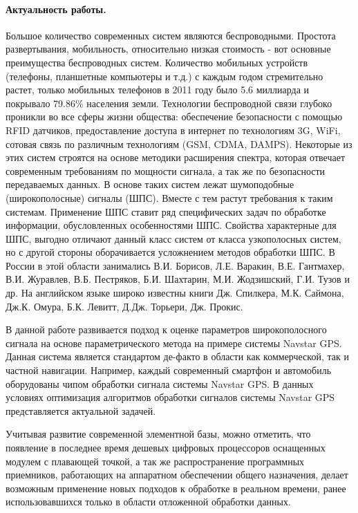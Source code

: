 \paragraph{Актуальность работы.} Большое количество современных систем являются беспроводными. Простота развертывания, мобильность, относительно низкая
стоимость - вот основные преимущества беспроводных систем. Количество мобильных устройств (телефоны, планшетные компьютеры
и т.д.) с каждым годом стремительно растет, только мобильных телефонов в 2011 году было 5.6 миллиарда и покрывало 79.86\%
 населения земли. Технологии беспроводной связи глубоко проникли во все сферы жизни общества:
обеспечение безопасности с помощью RFID датчиков, предоставление доступа в интернет по технологиям 3G, WiFi, 
сотовая связь по различным технологиям (GSM, CDMA, DAMPS). Некоторые из этих систем строятся на основе методики
расширения спектра, которая отвечает современным требованиям по мощности сигнала, а так же по безопасности передаваемых
данных. В основе таких систем лежат шумоподобные (широкополосные) сигналы (ШПС). Вместе с тем растут требования к таким
системам. Применение ШПС ставит ряд специфических задач по обработке информации, обусловленных особенностями ШПС.
Свойства характерные для ШПС, выгодно отличают данный класс систем от класса узкополосных систем, но с другой стороны
оборачивается усложнением методов обработки ШПС. В России в этой области занимались В.И. Борисов, Л.Е. Варакин, В.Е. Гантмахер,
В.И. Журавлев, В.Б. Пестряков, Б.И. Шахтарин, М.И. Жодзишский, Г.И. Тузов и др. На английском языке широко известны книги
Дж. Спилкера, М.К. Саймона, Дж.К. Омура, Б.К. Левитт, Д.Дж. Торьери, Дж. Прокис.

В данной работе развивается подход к оценке параметров широкополосного сигнала на основе параметрического метода на примере системы Navstar GPS. 
Данная система является стандартом де-факто в области как коммерческой, так и частной навигации. Например, каждый современный смартфон и автомобиль оборудованы
чипом обработки сигнала системы Navstar GPS. В данных условиях оптимизация алгоритмов обработки сигналов системы Navstar GPS
представляется актуальной задачей.

Учитывая развитие современной элементной базы, можно отметить, что появление в последнее время дешевых цифровых процессоров оснащенных модулем
с плавающей точкой, а так же распространение программных приемников, работающих на аппаратном обеспечении общего назначения, 
делает возможным применение новых подходов к обработке в реальном времени, ранее использовавшихся только в области отложенной обработки данных.

